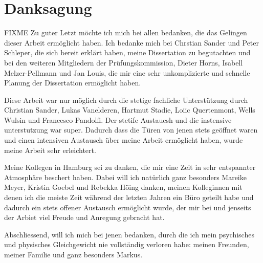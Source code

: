 \chapter*{Danksagung}
FIXME
Zu guter Letzt möchte ich mich bei allen bedanken, die das Gelingen dieser Arbeit ermöglicht haben.
Ich bedanke mich bei Chrstian Sander und Peter Schleper, die sich bereit erklärt haben, meine Dissertation zu begutachten und bei den  weiteren Mitgliedern der Prüfungskommission, Dieter Horns, Isabell Melzer-Pellmann und Jan Louis, die mir eine sehr unkomplizierte und schnelle Planung der Dissertation ermöglicht haben.

Diese Arbeit war nur möglich durch die stetige fachliche Unterstützung durch Christian Sander, Lukas Vanelderen, Hartmut Stadie, Loiic Quertenmont, Wells Wulsin und Francesco Pandolfi.
Der stetife Austaucsh und die instensive unterstutzung war super.
Dadurch dass die Türen von jenen stets geöffnet waren und einen intensiven Austausch über meine Arbeit ermöglicht haben, wurde meine Arbeit sehr erleichtert. 


Meine Kollegen in Hamburg sei zu danken, die mir eine Zeit in sehr entspannter Atmosphäre beschert haben.
Dabei will ich natürlich ganz besonders Mareike Meyer, Kristin Goebel und Rebekka Höing danken, meinen Kolleginnen mit denen ich die meiste Zeit während der letzten Jahren ein Büro geteilt habe und dadurch ein stets offener Austausch ermöglicht wurde, der mir bei und jenseits der Arbiet viel Freude und Anregung gebracht hat.    

Abschliessend, will ich mich bei jenen bedanken, durch die ich mein psychisches und physisches Gleichgewicht nie vollständig verloren habe: meinen Freunden, meiner Familie und ganz besonders Markus.  
